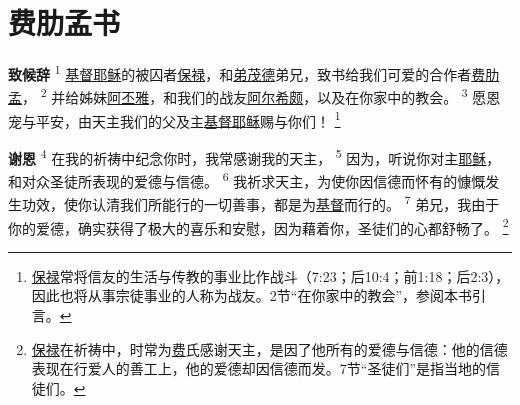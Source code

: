\chapter*{费肋孟书}


\textbf{致候辞\quad}
\textsuperscript{1}
\uline{基督}\uline{耶稣}的被囚者\uline{保禄}，和\uline{弟茂德}弟兄，致书给我们可爱的合作者\uline{费肋孟}，
\textsuperscript{2}
并给姊妹\uline{阿丕雅}，和我们的战友\uline{阿尔希颇}，以及在你家中的教会。
\textsuperscript{3}
愿恩宠与平安，由天主我们的父及主\uline{基督}\uline{耶稣}赐与你们！
\renewcommand\thefootnote{\ding{\numexpr171+\value{footnote}}}
\footnote{\uline{保禄}常将信友的生活与传教的事业比作战斗（7:23；后10:4；前1:18；后2:3），因此也将从事宗徒事业的人称为战友。2节“在你家中的教会”，参阅本书引言。}

\textbf{谢恩\quad}
\textsuperscript{4}
在我的祈祷中纪念你时，我常感谢我的天主，
\textsuperscript{5}
因为，听说你对主\uline{耶稣}，和对众圣徒所表现的爱德与信德。
\textsuperscript{6}
我祈求天主，为使你因信德而怀有的慷慨发生功效，使你认清我们所能行的一切善事，都是为\uline{基督}而行的。
\textsuperscript{7}
弟兄，我由于你的爱德，确实获得了极大的喜乐和安慰，因为藉着你，圣徒们的心都舒畅了。
\footnote{\uline{保禄}在祈祷中，时常为\uline{费}氏感谢天主，是因了他所有的爱德与信德：他的信德表现在行爱人的善工上，他的爱德却因信德而发。7节“圣徒们”是指当地的信徒们。}

